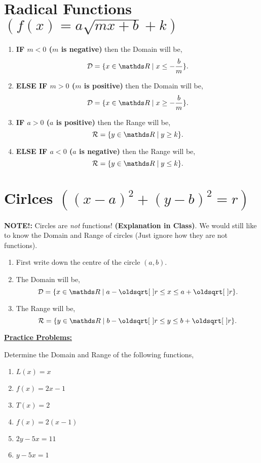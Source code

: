 \documentclass[12pt]{article} %
\begin{document}
  \section{Radical Functions $(f(x) = a\sqrt{mx + b} + k)$ }
  \begin{enumerate}
    \item \textbf{IF $m < 0$ ($m$ is negative)} then the Domain will be,
      \[ \mathcal{D} = \{x\in \R \mid x \leq -\frac{b}{m}\} 
      .\] 
    \item \textbf{ELSE IF $m > 0$ ($m$ is positive)} then the Domain will be,
      \[
            \mathcal{D} = \{x \in \R \mid x \geq -\frac{b}{m}\} 
      .\] 
    \item \textbf{IF $a > 0$ ($a$ is positive)} then the Range will be,
      \[
            \mathcal{R} = \{y\in \R \mid y \geq k\} 
      .\] 
    \item \textbf{ELSE IF $a < 0$ ($a$ is negative)} then the Range will be,
      \[
            \mathcal{R} = \{y\in \R \mid y \leq k\} 
      .\] 
  \end{enumerate}
  
  \section{Cirlces $\left((x - a)^2 + (y - b)^2 = r\right)$}
  \textbf{NOTE!: }Circles are \emph{not} functions! \textbf{(Explanation in Class)}. We would still like to know the Domain and
  Range of circles (Just ignore how they are not functions).
  \begin{enumerate}
    \item First write down the centre of the circle $(a,b)$.
    \item The Domain will be,
      \[
        \mathcal{D} = \{x\in \R \mid a - \sqrt{r} \leq x \leq a + \sqrt{r} \} 
      .\] 
    \item The Range will be,
      \[
      \mathcal{R} = \{y \in \R \mid b - \sqrt{r} \leq y \leq b + \sqrt{r} \} 
      .\] 
  \end{enumerate}

  \newpage

\textbf{\underline{\Large{Practice Problems:}}}
\begin{qstn}
  Determine the Domain and Range of the following functions,
  \begin{enumerate}[label=(\alph*)]
    \item $L(x) = x$
    \item $f(x) = 2x - 1$
    \item $T(x) = 2$
    \item $f(x) = 2(x-1)$
    \item $2y - 5x = 11$
    \item $y - 5x = 1$
  \end{enumerate}
\end{qstn}
\end{document}
